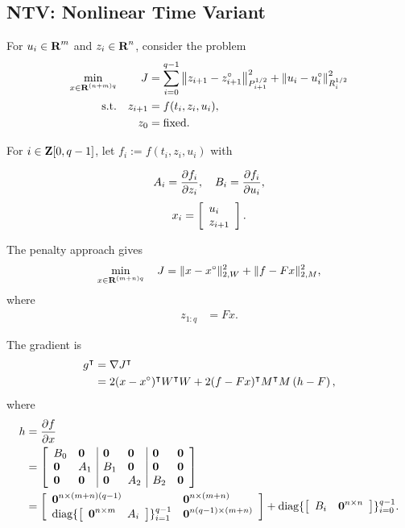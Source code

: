 \documentclass{article}
\begin{document}
\subsection{NTV: Nonlinear Time Variant}

    For $u_i\in\textbf{R}^m$ and $z_i\in\textbf{R}^n$, consider the problem
    \begin{align*}
        \min_{x\in\textbf{R}^{(n+m)q}}\quad\quad J&=\sum_{i=0}^{q-1}
        \left\|z_{i+1}-z_{i+1}^\circ\right\|_{P_{i+1}^{1/2}}^2
        +\left\|u_i-u_i^\circ\right\|_{R_i^{1/2}}^2\\
        \text{s.t.}\quad z_{i+1} &= f(t_i,z_i,u_i),\\
            z_{0} & = \text{fixed}.
    \end{align*}

    For $i\in\textbf{Z}[0,q-1]$, let $f_i := f(t_i,z_i,u_i)$ with

    \begin{align*}
        A_i = \frac{\partial f_i}{\partial z_i},\quad B_i = \frac{\partial f_i}{\partial u_i},
    \end{align*}
    \begin{align*}
        x_i =\left[\begin{array}{lllllllllllllllllll}u_i\\z_{i+1}\end{array}\right].
    \end{align*}

    The penalty approach gives
    \begin{align*}
        \min_{x\in\textbf{R}^{(m+n)q}}\quad J = \|x-x^\circ\|_{2,W}^2 + \|f- Fx \|_{2,M}^2,
    \end{align*}
    where
    \begin{align*}
        z_{1:q}&=Fx.
    \end{align*}

    The gradient is
    \begin{align*}
        g^\intercal&=\nabla J^\intercal\\
        &=2(x-x^\circ)^\intercal W^\intercal W + 2(f-Fx)^\intercal M^\intercal M\left(h-F\right),
    \end{align*}
    where 
    \begin{align*}
        h&=\frac{\partial f}{\partial x}\\
        &= \left[\begin{array}{ll|ll|ll}
            B_0
        &
            \textbf{0} 
        &
            \textbf{0} 
        &
            \textbf{0} 
        &
            \textbf{0} 
        &
            \textbf{0} 
    \\
            \textbf{0} 
        &
            A_1
        &
            B_1                   
        &
            \textbf{0} 
        &
            \textbf{0} 
        &
            \textbf{0} 
    \\
            \textbf{0} 
        &
            \textbf{0} 
        &
            \textbf{0} 
        &
            A_2
        &
            B_2
        &
            \textbf{0} 
    \end{array}
    \right]\\
    &=\left[\begin{array}{lllllllllllllllllll}\textbf{0}^{n\times (m+n)(q-1)} & \textbf{0}^{n\times (m+n)} \\
        \text{diag}\{\left[\begin{array}{lllllllllllllllllll}\textbf{0}^{n\times m}&A_i\end{array}\right]\}_{i=1}^{q-1} & \textbf{0}^{n(q-1)\times(m+n)} \end{array}\right]+
        \text{diag}\{\left[\begin{array}{lllllllllllllllllll}B_i&\textbf{0}^{n\times n} \end{array}\right]\}_{i=0}^{q-1}.
    \end{align*}
\end{document}
